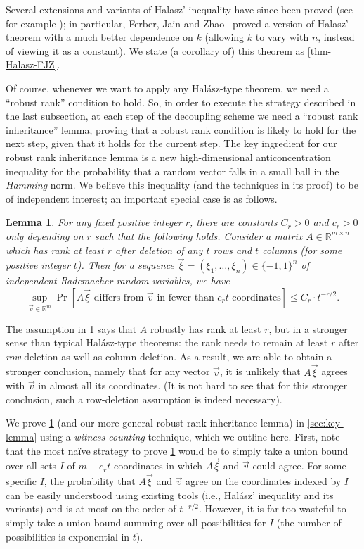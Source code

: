\documentclass[english]{article}
\newtheorem{lemma}[theorem]{Lemma}
\theoremstyle{remark}
\numberwithin{equation}{section}
\numberwithin{figure}{section}
\newcommand{\RR}{\mathbb{R}}
\newcommand{\mb}{\mathbb}
\begin{document}
Several extensions and variants of Halasz' inequality have since been proved (see for example \cite{FJZ22,FKS21b,HO,TV06}); in particular, Ferber, Jain and Zhao~\cite{FJZ22} proved a version of Halasz' theorem with a much better dependence on $k$ (allowing $k$ to vary with $n$, instead of viewing it as a constant). We state (a corollary of) this theorem as \cref{thm-Halasz-FJZ}.

Of course, whenever we want to apply any Hal\'asz-type theorem, we need a ``robust rank'' condition to hold. So, in order to execute the strategy described in the last subsection, at each step of the decoupling scheme we need a ``robust rank inheritance'' lemma, proving that a robust rank condition is likely to hold for the next step, given that it holds for the current step. The key ingredient for our robust rank inheritance lemma is a new high-dimensional anticoncentration inequality for the probability that a random vector falls in a small ball in the \emph{Hamming} norm. We believe this inequality (and the techniques in its proof) to be of independent interest; an important special case is as follows.

\begin{lemma}\label{lem:baby-key}
For any fixed positive integer $r$, there are constants $C_r>0$ and $c_r>0$ only depending on $r$ such that the following holds. Consider a matrix $A\in \RR ^{m\times n}$ which has rank at least $r$ after deletion of any $t$ rows and $t$ columns (for some positive integer $t$).
Then for a sequence $\vec{\xi}=(\xi_{1},\dots,\xi_{n})\in\{-1,1\}^{n}$ of independent Rademacher random variables,
we have
\[
\sup_{\vec v\in \mb R^m}\Pr[A\vec{\xi}\text{ differs from }\vec{v}\text{ in fewer than }c_r t\text{ coordinates}]\le C_r \cdot t^{-r/2}.
\]
\end{lemma}

The assumption in \cref{lem:baby-key} says that $A$ robustly has rank at least $r$, but in a stronger sense than typical Hal\'asz-type theorems: the rank needs to remain at least $r$ after \emph{row} deletion as well as column deletion. As a result, we are able to obtain a stronger conclusion, namely that for any vector $\vec v$, it is unlikely that $A\vec \xi$ agrees with $\vec v$ in almost all its coordinates. (It is not hard to see that for this stronger conclusion, such a row-deletion assumption is indeed necessary).

We prove \cref{lem:baby-key} (and our more general robust rank inheritance lemma) in \cref{sec:key-lemma} using a \emph{witness-counting} technique, which we outline here. First, note that the most na\"ive strategy to prove \cref{lem:baby-key} would be to simply take a union bound over all sets $I$ of $m-c_r t$ coordinates in which $A\vec \xi$ and $\vec v$ could agree. For some specific $I$, the probability that $A\vec \xi$ and $\vec v$ agree on the coordinates indexed by $I$ can be easily understood using existing tools (i.e., Hal\'asz' inequality and its variants) and is at most on the order of $t^{-r/2}$. However, it is far too wasteful to simply take a union bound summing over all possibilities for $I$ (the number of possibilities is exponential in $t$). 
\end{document}
